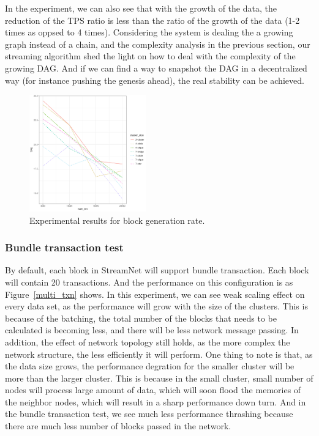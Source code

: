 In the experiment, we can also see that with the growth of the data, the reduction of the TPS ratio is less than the ratio of the growth of the data (1-2 times as oppsed to 4 times).
Considering the system is dealing the a growing graph instead of a chain, and the complexity analysis in the previous section,
our streaming algorithm shed the light on how to deal with the complexity of the growing DAG.
And if we can find a way to snapshot the DAG in a decentralized way (for instance pushing the genesis ahead), the real stability can be achieved.

\begin{figure}[!ht]
\begin{center}
\includegraphics[width=0.45\textwidth]{figures/single_txn.pdf}
    \caption{
        Experimental results for block generation rate.
     }
\label{single_txn}
\end{center}
\end{figure}



\subsubsection {Bundle transaction test}

By default, each block in StreamNet will support bundle transaction. 
Each block will contain 20 transactions.
And the performance on this configuration is as Figure~\ref{multi_txn} shows.
In this experiment, we can see weak scaling effect on every data set, as the performance will grow with the size of the clusters.
This is because of the batching, the total number of the blocks that needs to be calculated is becoming less, and there will be less network message passing.
In addition, the effect of network topology still holds, as the more complex the network structure, the less efficiently it will perform.
One thing to note is that, as the data size grows, the performance degration for the smaller cluster will be more than the larger cluster.
This is because in the small cluster, small number of nodes will process large amount of data, which will soon flood the memories of the neighbor nodes, which will result in a sharp performance down turn.
And in the bundle transaction test, we see much less performance thrashing because there are much less number of blocks passed in the network. 

